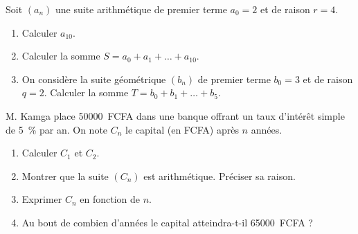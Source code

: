 \documentclass[11pt]{article}
\begin{document}
\begin{exercice}
Soit $(a_n)$ une suite arithmétique de premier terme $a_0 = 2$ et de raison $r = 4$.
\begin{enumerate}
    \item Calculer $a_{10}$.
    \item Calculer la somme $S = a_0 + a_1 + \dots + a_{10}$.
    \item On considère la suite géométrique $(b_n)$ de premier terme $b_0 = 3$ et de raison $q = 2$. Calculer la somme $T = b_0 + b_1 + \dots + b_5$.
\end{enumerate}
\end{exercice}

\begin{exercice}
M. Kamga place \SI{50000}{FCFA} dans une banque offrant un taux d'intérêt simple de \SI{5}{\%} par an. On note $C_n$ le capital (en FCFA) après $n$ années.
\begin{enumerate}
    \item Calculer $C_1$ et $C_2$.
    \item Montrer que la suite $(C_n)$ est arithmétique. Préciser sa raison.
    \item Exprimer $C_n$ en fonction de $n$.
    \item Au bout de combien d'années le capital atteindra-t-il \SI{65000}{FCFA} ?
\end{enumerate}
\end{exercice}
\end{document}
